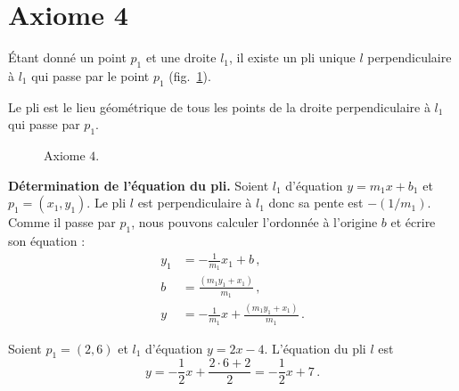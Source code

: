 

\section{Axiome 4}\label{s.ax4}


\begin{axiom}
Étant donné un point $p_1$ et une droite $l_1$, il existe un pli unique $l$ perpendiculaire à $l_1$ qui passe par le point $p_1$ (fig.~\ref{f.origami-axiom4}).
\end{axiom}

Le pli est le lieu géométrique de tous les points de la droite perpendiculaire à $l_1$ qui passe par $p_1$.

\begin{figure}[htbp]
\centering
{}
\caption{Axiome  $4$.}\label{f.origami-axiom4}
\end{figure}

\noindent\textbf{Détermination de l'équation du pli.}
Soient $l_1$ d'équation $y = m_1x + b_1$ et  $p_1=(x_1,y_1)$. Le pli $l$ est perpendiculaire à $l_1$ donc sa pente est $-(1/m_1)$. Comme il passe par $p_1$, nous pouvons calculer l'ordonnée à l'origine $b$ et écrire son équation :
\begin{align*}
y_1&=-\frac{1}{m_1} x_1 + b\,,\\
b&= \frac{(m_1 y_1+x_1)}{m_1}\,,\\
y&=-\frac{1}{m_1} x +\frac{(m_1y_1+x_1)}{m_1}\,.
\end{align*}
\begin{example}
Soient $p_1=(2,6)$ et  $l_1$ d'équation $y=2x-4$. L'équation du pli $l$ est 
\[
y=-\frac{1}{2}x + \frac{2\cdot 6 + 2}{2}=-\frac{1}{2}x + 7\,.
\]
\end{example}


